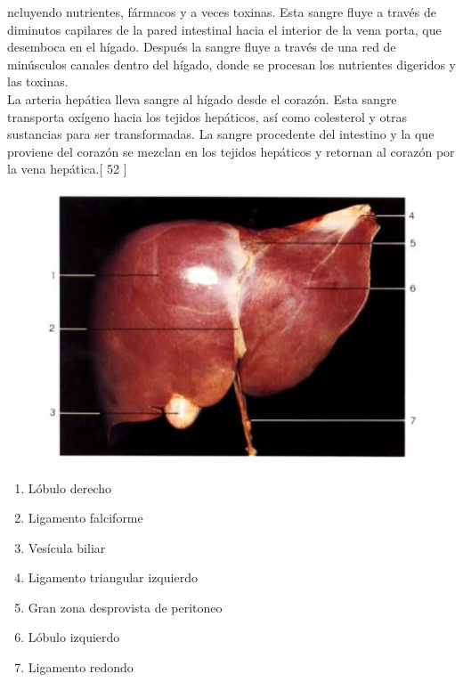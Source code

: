 ncluyendo nutrientes, fármacos y a veces toxinas. Esta sangre fluye a través de diminutos capilares de la pared intestinal hacia el interior de la vena porta, que desemboca en el hígado. 
Después la sangre fluye a través de una red de minúsculos canales dentro del hígado, donde se procesan los nutrientes digeridos y las toxinas.\\
La arteria hepática lleva sangre al hígado desde el corazón. Esta sangre transporta oxígeno hacia los tejidos hepáticos, así como colesterol y otras sustancias para ser transformadas. 
La sangre procedente del intestino y la que proviene del corazón se mezclan en los tejidos hepáticos y retornan al corazón por la vena hepática.[ 52 ]\\
\begin{figure}[H]
	\begin{center}
 		\includegraphics[width = 1\textwidth]{v2/images/image12.png}
	\end{center} 
\end{figure}
\begin{enumerate}
    \item Lóbulo derecho
    \item Ligamento falciforme
    \item Vesícula biliar
    \item Ligamento triangular izquierdo
    \item Gran zona desprovista de peritoneo
    \item Lóbulo izquierdo
    \item Ligamento redondo    
\end{enumerate}

